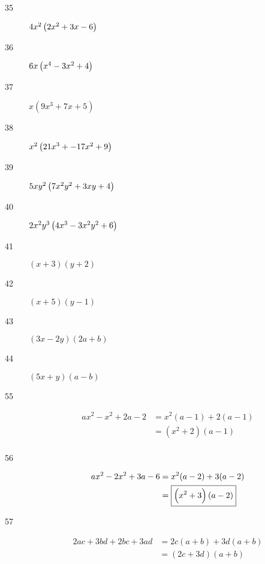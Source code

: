 \documentclass[letterpaper]{exam}
\begin{document}
    \begin{description}

      \item[35] $4x^2 \del{ 2x^2 + 3x - 6 }$

      \item[36] $6x \del{ x^4 - 3x^2 + 4 }$

      \item[37] $x(9x^3 + 7x + 5)$

      \item[38] $x^2 \del{ 21x^3 + - 17x^2 + 9 }$

      \item[39] $5xy^2 \del{ 7x^2y^2 + 3xy + 4 }$

      \item[40] $ 2x^2y^3 \del{ 4x^3 - 3x^2y^2 + 6 }$

      \item[41] $(x + 3)(y + 2)$

      \item[42] $(x + 5)(y - 1)$

      \item[43] $(3x - 2y)(2a + b)$

      \item[44] $(5x + y)(a - b)$

      \item[55] 
        \begin{align*}
          ax^2 - x^2 + 2a - 2 & = x^2(a - 1) + 2(a - 1) \\
                              & = \boxed{ (x^2 + 2)(a - 1) } \\
        \end{align*}

      \item[56]
        \begin{align*}
          ax^2 - 2x^2 + 3a - 6 & = x^2 (a - 2) + 3(a - 2) \\
                               & = \boxed{ \del{x^2 + 3}(a - 2) } \\
        \end{align*}

      \item[57]
      \begin{align*}
         2ac + 3bd + 2bc + 3ad & = 2c(a + b) + 3d(a + b) \\
                               & = \boxed{ (2c + 3d)(a + b) } \\
      \end{align*}


\end{description}
\end{document}
